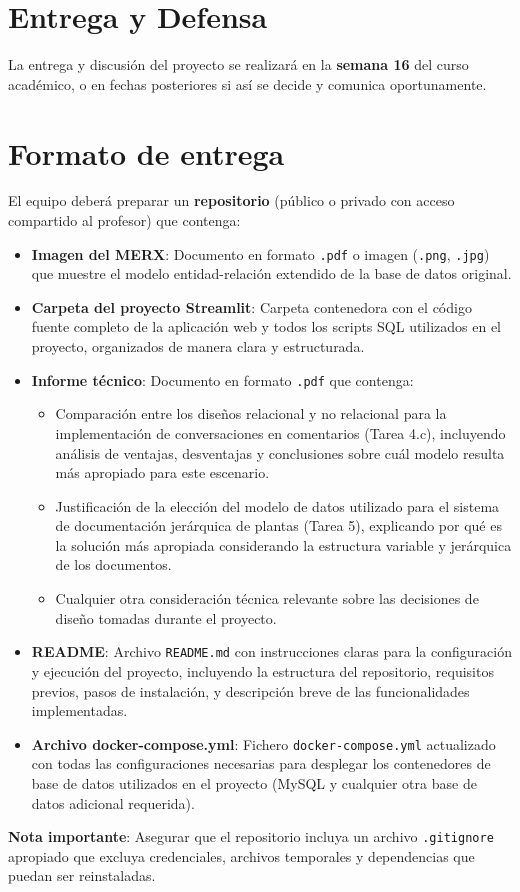 \documentclass[10pt]{article}
\begin{document}
	\section*{Entrega y Defensa}

	La entrega y discusión del proyecto se realizará en la \textbf{semana 16} del curso académico, o en fechas posteriores si así se decide y comunica oportunamente.

	\section*{Formato de entrega}

	El equipo deberá preparar un \textbf{repositorio} (público o privado con acceso compartido al profesor) que contenga:

	\begin{itemize}
		\item \textbf{Imagen del MERX}: Documento en formato \texttt{.pdf} o imagen (\texttt{.png}, \texttt{.jpg}) que muestre el modelo entidad-relación extendido de la base de datos original.

		\item \textbf{Carpeta del proyecto Streamlit}: Carpeta contenedora con el código fuente completo de la aplicación web y todos los scripts SQL utilizados en el proyecto, organizados de manera clara y estructurada.

		\item \textbf{Informe técnico}: Documento en formato \texttt{.pdf} que contenga:
		\begin{itemize}
			\item Comparación entre los diseños relacional y no relacional para la implementación de conversaciones en comentarios (Tarea 4.c), incluyendo análisis de ventajas, desventajas y conclusiones sobre cuál modelo resulta más apropiado para este escenario.
			\item Justificación de la elección del modelo de datos utilizado para el sistema de documentación jerárquica de plantas (Tarea 5), explicando por qué es la solución más apropiada considerando la estructura variable y jerárquica de los documentos.
			\item Cualquier otra consideración técnica relevante sobre las decisiones de diseño tomadas durante el proyecto.
		\end{itemize}

		\item \textbf{README}: Archivo \texttt{README.md} con instrucciones claras para la configuración y ejecución del proyecto, incluyendo la estructura del repositorio, requisitos previos, pasos de instalación, y descripción breve de las funcionalidades implementadas.

		\item \textbf{Archivo docker-compose.yml}: Fichero \texttt{docker-compose.yml} actualizado con todas las configuraciones necesarias para desplegar los contenedores de base de datos utilizados en el proyecto (MySQL y cualquier otra base de datos adicional requerida).
	\end{itemize}

	\vspace{2mm}

	\textbf{Nota importante}: Asegurar que el repositorio incluya un archivo \texttt{.gitignore} apropiado que excluya credenciales, archivos temporales y dependencias que puedan ser reinstaladas.
\end{document}
